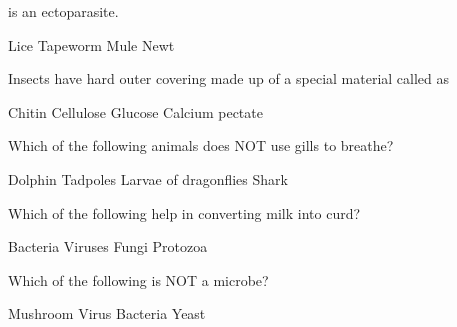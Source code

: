 \documentclass[a4paper,answers]{exam}
\begin{document}
\begin{center}
\end{center}

\begin{center}
    \vspace{5mm}

    \vspace{5mm}
\end{center}

\begin{questions}
    \question \fillin is an ectoparasite.

    \begin{randomizeoneparchoices}
        \CorrectChoice Lice
        \choice Tapeworm
        \choice Mule
        \choice Newt
    \end{randomizeoneparchoices}

    \question Insects have hard outer covering made up of a special material called as

    \begin{randomizeoneparchoices}
	    \CorrectChoice Chitin
	    \choice Cellulose
	    \choice Glucose
	    \choice Calcium pectate
    \end{randomizeoneparchoices}

    \question Which of the following animals does NOT use gills to breathe?

    \begin{randomizeoneparchoices}
        \CorrectChoice Dolphin
        \choice Tadpoles
        \choice Larvae of dragonflies
        \choice Shark
    \end{randomizeoneparchoices}

    \question Which of the following help in converting milk into curd?

    \begin{randomizeoneparchoices}
        \CorrectChoice Bacteria
        \choice Viruses
        \choice Fungi
        \choice Protozoa
    \end{randomizeoneparchoices}

    \question Which of the following is NOT a microbe?

    \begin{randomizeoneparchoices}
        \CorrectChoice Mushroom
        \choice Virus
        \choice Bacteria
        \choice Yeast
    \end{randomizeoneparchoices}


\end{questions}
\end{document}
